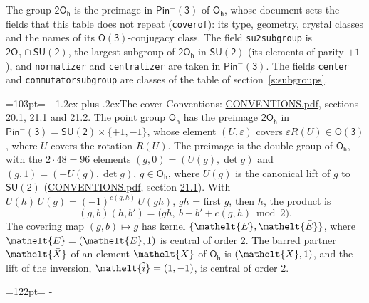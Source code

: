 \documentclass[10pt,a4paper]{article}
\makeatletter
\renewcommand\section{\@startsection{section}{1}{\z@}{-3ex plus -1ex minus -.2ex}%
  {1.2ex plus .2ex}{\normalfont\large\sffamily\bfseries\color{parttitle}}}
\newcommand{\needspace}[1]{\par\penalty-100\begingroup\dimen0=#1\relax\dimen2=\pagegoal
  \advance\dimen2-\pagetotal\ifdim\dimen0>\dimen2\relax\ifdim\dimen2>0pt\vfil\break\fi\fi
  \endgroup}
\numberwithin{equation}{section}
\newcommand{\eltfont}[1]{{\let\sigma\eltsigma\mathelt{#1}}}
\newcommand{\grp}[1]{\mathsf{#1}}
\newcommand{\elt}[1]{\eltfont{#1}}
\newcommand{\dirprod}{\times}
\newcommand{\barred}[1]{\bar{#1}}
\newcommand{\lift}[1]{\tilde{#1}}
\makeatother
\begin{document}
\leavevmode\label{n:element.inversion}\label{n:group.preimage}The group $\grp{2O_{h}}$ is the preimage in $\grp{Pin^{-}(3)}$ of \href{../../../rotation/data/pdf/Oh.pdf}{$\grp{O_{h}}$}, whose document sets the fields that this table does not repeat (\texttt{coverof}): its type, geometry, crystal classes and the names of its \href{../../../rotation/data/pdf/O3.pdf}{$\grp{O(3)}$}-conjugacy class. The field \texttt{su2subgroup} is $\grp{2O_{h}} \cap \grp{SU(2)}$, the largest subgroup of $\grp{2O_{h}}$ in $\grp{SU(2)}$ (its elements of parity $+1$), and \texttt{normalizer} and \texttt{centralizer} are taken in $\grp{Pin^{-}(3)}$. The fields \texttt{center} and \texttt{commutatorsubgroup} are classes of the table of section~\ref{s:subgroups}.
\needspace{103pt}
\section{The cover}\label{s:cover}
Conventions: \href{../../CONVENTIONS.pdf}{CONVENTIONS.pdf}, sections \href{../../CONVENTIONS.pdf\#conv.20.1}{20.1}, \href{../../CONVENTIONS.pdf\#conv.21.1}{21.1} and \href{../../CONVENTIONS.pdf\#conv.21.2}{21.2}.
\leavevmode\label{n:group.pin.minus}\label{n:group.su2}\label{n:local.pin.sign}\label{n:matrix.covered}\label{n:matrix.lift.su2}\label{n:index.bar}The point group $\grp{O_{h}}$ has the preimage $\grp{2O_{h}}$ in $\grp{Pin^{-}(3)} = \grp{SU(2)} \dirprod \{+1, -1\}$, whose element $(U, \varepsilon)$ covers $\varepsilon R(U) \in \grp{O(3)}$, where $U$ covers the rotation $R(U)$. The preimage is the double group of $\grp{O_{h}}$, with the $2 \cdot 48 = 96$ elements $(g, 0) = (U(g), \det g)$ and $(g, 1) = (-U(g), \det g)$, $g \in \grp{O_{h}}$, where $U(g)$ is the canonical lift of $g$ to $\grp{SU(2)}$ (\href{../../CONVENTIONS.pdf}{CONVENTIONS.pdf}, section \href{../../CONVENTIONS.pdf\#conv.21.1}{21.1}). \label{n:function.cocycle}With $U(h)\,U(g) = (-1)^{c(g,h)}\,U(gh)$, $gh$ = first $g$, then $h$, the product is
\begin{equation}\label{e:product}(g, b)(h, b') = \bigl(gh,\ b + b' + c(g, h) \bmod 2\bigr).\end{equation}
\leavevmode\label{n:mark.bar}The covering map $(g, b) \mapsto g$ has kernel $\{\elt{E}, \elt{\barred{E}}\}$, where $\elt{\barred{E}} = (\elt{E}, 1)$ is central of order 2. \label{n:element.named}\label{n:mark.lift}The barred partner $\elt{\barred{X}}$ of an element $\elt{X}$ of $\grp{O_{h}}$ is $(\elt{X}, 1)$, and the lift of the inversion, $\elt{\lift{i}} = (1, -1)$, is central of order 2.
\needspace{122pt}
\end{document}
